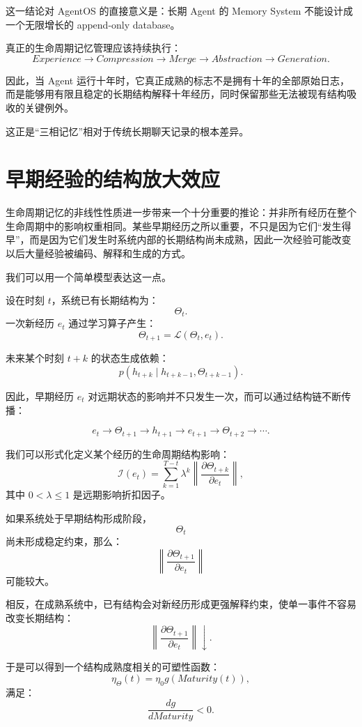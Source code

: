 这一结论对 AgentOS 的直接意义是：长期 Agent 的 Memory System 不能设计成一个无限增长的 append-only database。

真正的生命周期记忆管理应该持续执行：
\[
Experience
\rightarrow
Compression
\rightarrow
Merge
\rightarrow
Abstraction
\rightarrow
Generation.
\]

因此，当 Agent 运行十年时，它真正成熟的标志不是拥有十年的全部原始日志，而是能够用有限且稳定的长期结构解释十年经历，同时保留那些无法被现有结构吸收的关键例外。

这正是“三相记忆”相对于传统长期聊天记录的根本差异。

\section{早期经验的结构放大效应}

生命周期记忆的非线性性质进一步带来一个十分重要的推论：并非所有经历在整个生命周期中的影响权重相同。某些早期经历之所以重要，不只是因为它们“发生得早”，而是因为它们发生时系统内部的长期结构尚未成熟，因此一次经验可能改变以后大量经验被编码、解释和生成的方式。

我们可以用一个简单模型表达这一点。

设在时刻 \(t\)，系统已有长期结构为：
\[
\Theta_t.
\]
一次新经历 \(e_t\) 通过学习算子产生：
\[
\Theta_{t+1}
=
\mathcal L
(\Theta_t,e_t).
\]

未来某个时刻 \(t+k\) 的状态生成依赖：
\[
p(h_{t+k}\mid h_{t+k-1},\Theta_{t+k-1}).
\]

因此，早期经历 \(e_t\) 对远期状态的影响并不只发生一次，而可以通过结构链不断传播：

\[
e_t
\rightarrow
\Theta_{t+1}
\rightarrow
h_{t+1}
\rightarrow
e_{t+1}
\rightarrow
\Theta_{t+2}
\rightarrow
\cdots.
\]

我们可以形式化定义某个经历的生命周期结构影响：
\[
\mathcal I(e_t)
=
\sum_{k=1}^{T-t}
\lambda^k
\left\|
\frac{\partial
\Theta_{t+k}}
{\partial e_t}
\right\|,
\]
其中 \(0<\lambda\le1\) 是远期影响折扣因子。

如果系统处于早期结构形成阶段，
\[
\Theta_t
\]
尚未形成稳定约束，那么：
\[
\left\|
\frac{\partial \Theta_{t+1}}
{\partial e_t}
\right\|
\]
可能较大。

相反，在成熟系统中，已有结构会对新经历形成更强解释约束，使单一事件不容易改变长期结构：
\[
\left\|
\frac{\partial \Theta_{t+1}}
{\partial e_t}
\right\|
\downarrow.
\]

于是可以得到一个结构成熟度相关的可塑性函数：
\[
\eta_\Theta(t)
=
\eta_0
g(Maturity(t)),
\]
满足：
\[
\frac{dg}{dMaturity}<0.
\]

